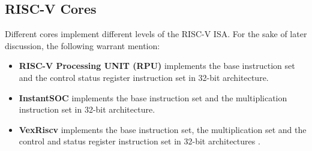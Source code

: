 		\subsection{RISC-V Cores}
			Different cores implement different levels of the RISC-V ISA. For the sake of later discussion, the following warrant mention:
			\begin{itemize}
				\item \textbf{RISC-V Processing UNIT (RPU)} implements the base instruction set and the control status register instruction set in 32-bit architecture.
				\item \textbf{InstantSOC} implements the base instruction set and the multiplication instruction set in 32-bit architecture.
				\item \textbf{VexRiscv} implements the base instruction set, the multiplication set and the control and status register instruction set in 32-bit architectures \cite{riscvCores}.
			\end{itemize}
			
		